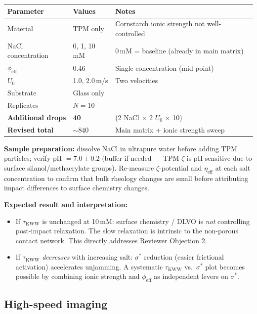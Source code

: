 \documentclass[11pt,letterpaper]{article}
\newcommand{\phieff}{\phi_{\mathrm{eff}}}
\newcommand{\taukww}{\tau_{\mathrm{KWW}}}
\newcommand{\etaeff}{\eta_{\mathrm{eff}}}
\newcommand{\sigstar}{\sigma^*}
\begin{document}
\begin{center}
\begin{tabular}{lll}
  \toprule
  Parameter & Values & Notes \\
  \midrule
  Material & TPM only & Cornstarch ionic strength not well-controlled \\
  NaCl concentration & 0, 1, 10\,mM & 0\,mM = baseline (already in main matrix) \\
  $\phieff$ & $0.46$ & Single concentration (mid-point) \\
  $U_0$ & 1.0, 2.0\,m/s & Two velocities \\
  Substrate & Glass only & \\
  Replicates & $N = 10$ & \\
  \midrule
  \textbf{Additional drops} & \textbf{40} & (2 NaCl $\times$ 2 $U_0$ $\times$ 10) \\
  \textbf{Revised total} & \textbf{${\sim}840$} & Main matrix + ionic strength sweep \\
  \bottomrule
\end{tabular}
\end{center}

\noindent\textbf{Sample preparation:} dissolve NaCl in ultrapure water before adding
TPM particles; verify pH $= 7.0 \pm 0.2$ (buffer if needed --- TPM $\zeta$ is
pH-sensitive due to surface silanol/methacrylate groups). Re-measure $\zeta$-potential
and $\etaeff$ at each salt
concentration to confirm that bulk rheology changes are small before attributing
impact differences to surface chemistry changes.

\noindent\textbf{Expected result and interpretation:}
\begin{itemize}[noitemsep,topsep=3pt]
  \item If $\taukww$ is unchanged at 10\,mM: surface chemistry / DLVO is \emph{not}
    controlling post-impact relaxation. The slow relaxation is intrinsic to the
    non-porous contact network. This directly addresses Reviewer Objection 2.
  \item If $\taukww$ \emph{decreases} with increasing salt: $\sigstar$ reduction
    (easier frictional activation) accelerates unjamming. A systematic $\taukww$ vs.\
    $\sigstar$ plot becomes possible by combining ionic strength and $\phieff$ as
    independent levers on $\sigstar$.
\end{itemize}

\subsection{High-speed imaging}
\end{document}
